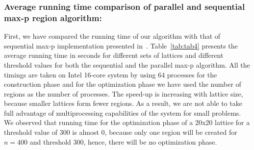 \documentclass[conference]{IEEEtran}
\begin{document}
\subsubsection*{Average running time comparison of parallel and sequential max-p region algorithm:}
First, we have compared the running time of our algorithm with that of
sequential max-p implementation presented in~\cite{r1}. Table~\ref{tab:tab4}
presents the average running time in seconds for different sets of lattices and
different threshold values for both the sequential and the parallel max-p
algorithm. All the timings are taken on Intel 16-core system by using 64
processes for the construction phase and for the optimization phase we have used
the number of regions as the number of processes. The speed-up is increasing
with lattice size, because smaller lattices form fewer regions. As a result, we
are not able to take full advantage of multiprocessing capabilities of the
system for small problems. We observed that running time for the optimization
phase of a 20x20 lattice for a threshold value of 300 is almost 0, because only
one region will be created for $n = 400$ and threshold 300, hence, there will be
no optimization phase.
\end{document}
